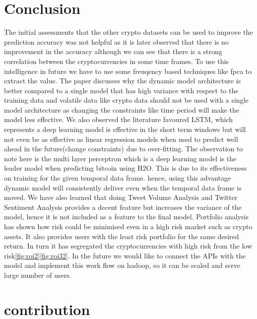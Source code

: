 \documentclass[final]{cvpr}
\begin{document}
\section{Conclusion}

The initial assessments that the other crypto datasets can be used to improve the prediction accuracy was not helpful as it is later observed that there is no improvement in the accuracy although we can see that there is a strong correlation between the cryptocurrencies in some time frames. To use this intelligence in future we have to use some freuqency based techniques like fpca to extract the value. The paper discusses why the dynamic model architecture is better compared to a single model that has high variance with respect to the training data and volatile data like crypto data should not be used with a single model architecture as changing the constraints like time period will make the model less effective. We also observed the literature favoured LSTM, which represents a deep learning model is effective in the short term windows but will not even be as effective as linear regression models when used  to predict well ahead in the future(change constraints) due to over-fitting. The observation to note here is the multi layer perceptron which is a deep learning model is the leader model when predicting bitcoin using H2O. This is due to its effectiveness on training for the given temporal data frame. hence, using this advantage dynamic model will consistently deliver even when the temporal data frame is moved. We have also learned that doing Tweet Volume Analysis and Twitter Sentiment Analysis provides a decent feature but increases the variance of the model, hence it is not included as a feature to the final model. Portfolio analysis has shown how risk could be minimised even in a high risk market such as crypto assets. It also provides users with the least risk portfolio for the same desired return. In turn it has segregated the cryptocurrencies with high risk from the low risk\ref{fig:roi2}\ref{fig:roi32}. In the future we would like to connect the APIs  with the model and implement this work flow on hadoop, so it can be scaled and serve large number of users. 







{\small


}

\section{contribution}
\end{document}
